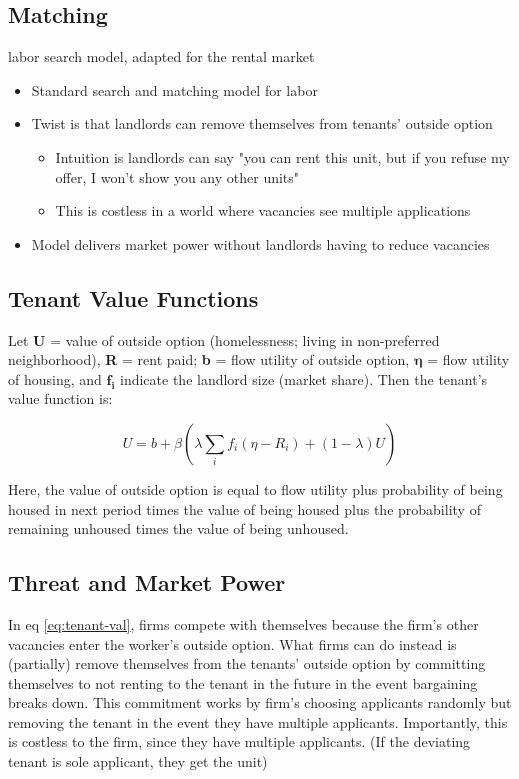 \subsection{Matching}
\cite{jarosh-search-2024} labor search model, adapted for the rental market 
    \begin{itemize}
        \item Standard search and matching model for labor
        \item Twist is that landlords can remove themselves from tenants' outside option
        \begin{itemize}
            \item Intuition is landlords can say "you can rent this unit, but if you refuse my offer, I won't show you any other units"
            \item This is costless in a world where vacancies see multiple applications
        \end{itemize}
        \item Model delivers market power without landlords having to reduce vacancies
    \end{itemize}

\subsection{Tenant Value Functions}

Let \textbf{U} = value of outside option (homelessness; living in non-preferred neighborhood), \textbf{R} = rent paid; \textbf{b} = flow utility of outside option, $\boldsymbol{\eta}$ = flow utility of housing, and $\boldsymbol{f_i}$ indicate the landlord size (market share). Then the tenant's value function is:

\begin{equation}
        U = b + \beta\left(\lambda \sum_{i} f_i(\eta - R_i) + (1-\lambda)U\right)\label{eq:tenant-val}
    \end{equation}\label{eq:tenant-val}

Here, the value of outside option is equal to flow utility plus probability of being housed in next period times the value of being housed plus the probability of remaining unhoused times the value of being unhoused.

\subsection{Threat and Market Power}

In eq \ref{eq:tenant-val}, firms compete with themselves because the firm's other vacancies enter the worker's outside option. What firms can do instead is (partially) remove themselves from the tenants' outside option by committing themselves to not renting to the tenant in the future in the event bargaining breaks down. This commitment works by firm's choosing applicants randomly but removing the tenant in the event they have multiple applicants. Importantly, this is costless to the firm, since they have multiple applicants. (If the deviating tenant is sole applicant, they get the unit)\\

